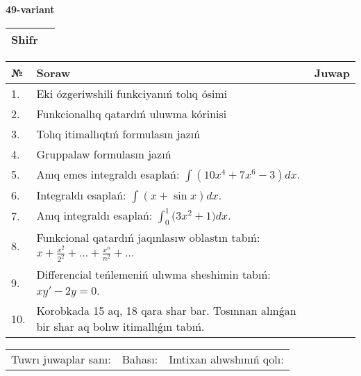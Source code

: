\documentclass{article}
\begin{document}
  \egroup
  
  \newpage
  
  
  \textbf{49-variant}\\
  
  \bgroup
  \def\arraystretch{1.6} %
  
  \begin{tabular}{|m{5.7cm}|m{9.5cm}|}
  \hline
  Shifr & \\
  \hline
  \end{tabular}
  
  \vspace{1cm}
  
  \begin{tabular}{|m{0.7cm}|m{10cm}|m{4cm}|}
  \hline
  № & Soraw & Juwap \\
  \hline
  1. & Eki ózgeriwshili funkciyanıń tolıq ósimi &  \\
  \hline
  2. & Funkcionallıq qatardıń uluwma kórinisi &  \\
  \hline
  3. & Tolıq itimallıqtıń formulasın jazıń &  \\
  \hline
  4. & Gruppalaw formulasın jazıń &  \\
  \hline
  5. & Anıq emes integraldı esaplań: \(\int{\left( 10x^{4} + 7x^{6} - 3 \right)dx}\). &  \\
  \hline
  6. & Integraldı esaplań: \(\int{(x + \sin x)dx}\). &  \\
  \hline
  7. & Anıq integraldı esaplań: \(\int_{0}^{1}{(3x^2 } + 1)dx\). &  \\
  \hline
  8. & Funkcional qatardıń jaqınlasıw oblastın tabıń: \(x + \frac{x^2 }{2^2 } + ... + \frac{x^{n}}{n^2 } + ...\) &  \\
  \hline
  9. & Differencial teńlemeniń ulıwma sheshimin tabıń: \(xy' - 2y = 0\). &  \\
  \hline
  10. & Korobkada 15 aq, 18 qara shar bar. Tosınnan alınǵan bir shar aq bolıw itimallıǵın tabıń. &  \\
  \hline
  \end{tabular}
  
  \vspace{1cm}
  
  \begin{tabular}{lll}
  Tuwrı juwaplar sanı: \underline{\hspace{1.5cm}} & 
  Bahası: \underline{\hspace{1.5cm}} & 
  Imtixan alıwshınıń qolı: \underline{\hspace{2cm}} \\
  \end{tabular}
  
\end{document}
